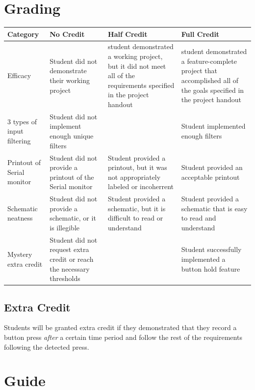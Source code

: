 \documentclass{article}
\begin{document}
\section*{Grading}
\begin{tabular}{ | p{1in} | p{1.75in} | p{1.75in} | p{1.75in} | }
    \hline
    \textbf{Category} & \textbf{No Credit} & \textbf{Half Credit} & \textbf{Full Credit} \\

    \hline
    Efficacy & 
    Student did not demonstrate their working project & 
    student demonstrated a working project, but it did not meet all of the requirements specified in the project handout & 
    student demonstrated a feature-complete project that accomplished all of the goals specified in the project handout \\
    \hline
    3 types of input filtering & 
    Student did not implement enough unique filters &
    &
    Student implemented enough filters \\
    \hline
    Printout of Serial monitor & 
    Student did not provide a printout of the Serial monitor &
    Student provided a printout, but it was not appropriately labeled or incoherrent&
    Student provided an acceptable printout \\
    \hline
    Schematic neatness & 
    Student did not provide a schematic, or it is illegible &
    Student provided a schematic, but it is difficult to read or understand &
    Student provided a schematic that is easy to read and understand \\
    \hline
    Mystery extra credit &
    Student did not request extra credit or reach the necessary thresholds & 
    &
    Student successfully implemented a button hold feature \\

    \hline
\end{tabular}

    \subsection*{Extra Credit}
    Students will be granted extra credit if they demonstrated that they record a button press \emph{after} a certain time period and follow the rest of the requirements following the detected press.

\section*{Guide}
\end{document}
